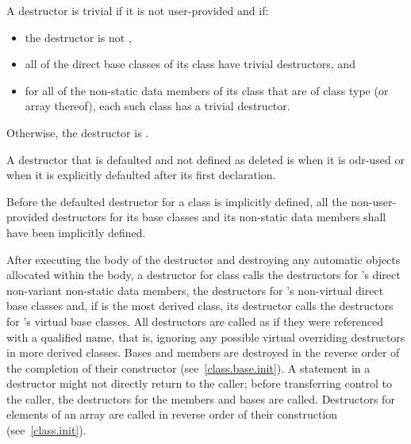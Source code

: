 \pnum
A destructor is trivial if it is not user-provided and if:

\begin{itemize}
\item the destructor is not ,

\item all of the direct base classes of its class have trivial destructors, and

\item for all of the non-static data members of its class that are of class
type (or array thereof), each such class has a trivial destructor.
\end{itemize}

Otherwise, the destructor is
.

\pnum
A destructor
that is defaulted and not defined as deleted
is
when it is odr-used
or when it is explicitly defaulted after its first declaration.

\pnum
Before the
defaulted destructor for a class is implicitly defined, all the non-user-provided
destructors for its base classes and its non-static data members shall have been
implicitly defined.

\pnum
{}%
%
%
After executing the body of the destructor and destroying
any automatic objects allocated within the body, a
destructor for class
calls the destructors for
's
direct non-variant non-static data members, the destructors for
's
non-virtual direct base classes and, if
is the most derived class,
its destructor calls the destructors for
's
virtual base classes.
All destructors are called as if they were referenced with a qualified name,
that is, ignoring any possible virtual overriding destructors in more
derived classes.
Bases and members are destroyed in the reverse order of the completion of
their constructor (see~\ref{class.base.init}).
A
statement in a destructor might not directly return to the
caller; before transferring control to the caller, the destructors for the
members and bases are called.
%
Destructors for elements of an array are called in reverse order of their
construction (see~\ref{class.init}).

